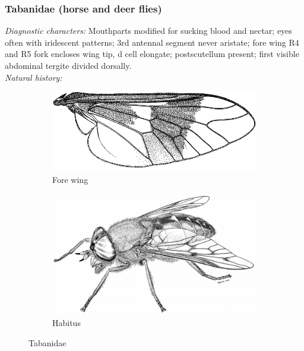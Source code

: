 \documentclass[letterpaper, 11pt]{article}
\begin{document}
\subsubsection{Tabanidae (horse and deer flies)}
\noindent{}\textit{Diagnostic characters:} Mouthparts modified for sucking blood and nectar; eyes often with iridescent patterns; 3rd antennal segment never aristate; fore wing R4 and R5 fork encloses wing tip, d cell elongate; postscutellum present; first visible abdominal tergite divided dorsally.\\

\noindent{}\textit{Natural history:} \\

\begin{figure}[ht!]
    \centering
    \begin{subfigure}[ht!]{0.4\textwidth}
        \includegraphics[width=\textwidth]{TabanidWing}
        \caption{Fore wing \citep[][Fig. 31.35]{mcalpine1981manual}}
        \label{fig:tabanid1}
    \end{subfigure}
    \qquad
    \begin{subfigure}[ht!]{0.5\textwidth}
        \includegraphics[width=\textwidth]{TabanidHabitus}
        \caption{Habitus \citep[][Fig. 31.1]{mcalpine1981manual}}
        \label{fig:tabanid2}
    \end{subfigure}
    \caption{Tabanidae}\label{fig:tabanids}
\end{figure}
\end{document}
